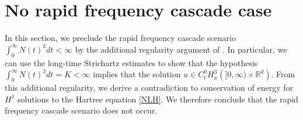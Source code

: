 \documentclass[reqno,11pt]{amsart}
\theoremstyle{plain}
\theoremstyle{definition}
\numberwithin{equation}{section}
\numberwithin{theorem}{section}
\def\geq{\geqslant}
\def\leq{\leqslant}
\def\R{\mathbb{R}}
\begin{document}







\section{No rapid frequency cascade case}\label{cascadesec}
In this section, we preclude the rapid frequency cascade scenario $\int_{0}^{\infty} N(t)^{3} d t<\infty$ by the additional regularity argument of \cite{Dodson-JAMS,Dodson-AJM,Dodson-Duke}. In particular, we can use the long-time Strichartz estimates to show that the hypothesis $\int_{0}^{\infty} N(t)^{3} d t=K<\infty$ implies that the solution $u \in C_{t}^{0} H_{x}^{3}\left([0, \infty) \times \R^d\right)$. From this additional regularity, we derive a contradiction to conservation of energy for $H^{1}$ solutions to the Hartree equation \eqref{NLH}. We therefore conclude that the rapid frequency cascade scenario does not occur.
\end{document}
